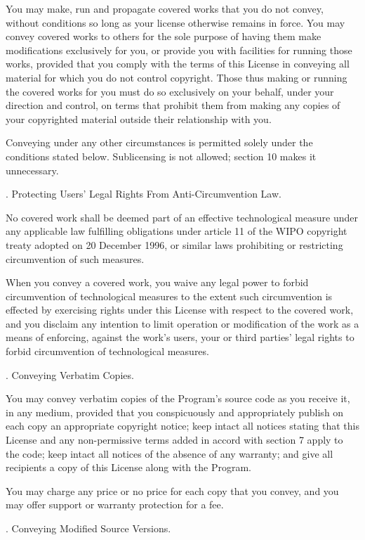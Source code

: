 You may make, run and propagate covered works that you do not
convey, without conditions so long as your license otherwise remains
in force.  You may convey covered works to others for the sole purpose
of having them make modifications exclusively for you, or provide you
with facilities for running those works, provided that you comply with
the terms of this License in conveying all material for which you do
not control copyright.  Those thus making or running the covered works
for you must do so exclusively on your behalf, under your direction
and control, on terms that prohibit them from making any copies of
your copyrighted material outside their relationship with you.

Conveying under any other circumstances is permitted solely under
the conditions stated below.  Sublicensing is not allowed; section 10
makes it unnecessary.

. Protecting Users' Legal Rights From Anti-Circumvention Law.

No covered work shall be deemed part of an effective technological
measure under any applicable law fulfilling obligations under article
11 of the WIPO copyright treaty adopted on 20 December 1996, or
similar laws prohibiting or restricting circumvention of such
measures.

When you convey a covered work, you waive any legal power to forbid
circumvention of technological measures to the extent such circumvention
is effected by exercising rights under this License with respect to
the covered work, and you disclaim any intention to limit operation or
modification of the work as a means of enforcing, against the work's
users, your or third parties' legal rights to forbid circumvention of
technological measures.

. Conveying Verbatim Copies.

You may convey verbatim copies of the Program's source code as you
receive it, in any medium, provided that you conspicuously and
appropriately publish on each copy an appropriate copyright notice;
keep intact all notices stating that this License and any
non-permissive terms added in accord with section 7 apply to the code;
keep intact all notices of the absence of any warranty; and give all
recipients a copy of this License along with the Program.

You may charge any price or no price for each copy that you convey,
and you may offer support or warranty protection for a fee.

. Conveying Modified Source Versions.

